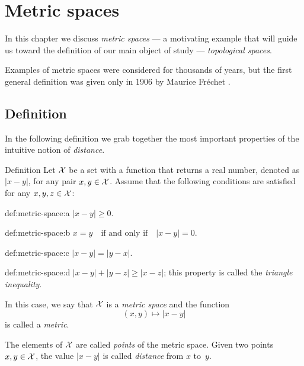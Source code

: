 \chapter{Metric spaces}

In this chapter we discuss \textit{metric spaces} --- 
a motivating example that will guide us toward the definition of our main object of study ---
\textit{topological spaces}.

Examples of metric spaces were considered for thousands of years,
but the first general definition was given only in 1906 by Maurice Fr\'echet \cite{frechet}.

\section{Definition}

In the following definition we grab together the most important properties of the intuitive notion of \textit{distance}.

\begin{thm}{Definition}\label{def:metric-space}
Let $\mathcal X$ be a set 
with a function 
that returns a real number, denoted as $|x-y|$,
for any pair $x,y\in\mathcal X$.
Assume that the following conditions are satisfied for any
$x,y,z\in \mathcal X$:

\begin{subthm}{def:metric-space:a}
$|x-y|\ge 0.$
\end{subthm}

\begin{subthm}{def:metric-space:b}
$x=y\quad\text{if and only if}\quad |x-y|=0.$
\end{subthm}

\begin{subthm}{def:metric-space:c}
$|x-y| = |y- x|.$
\end{subthm}

\begin{subthm}{def:metric-space:d}
$|x- y| + |y- z| \ge |x-z|$; this property is called the \emph{triangle inequality}.
\end{subthm}

In this case, we say that $\mathcal X$ is a \emph{metric space} 
and the function 
\[(x,y)\mapsto |x-y|\] 
is called a \emph{metric}. 

The elements of $\mathcal X$ are called \emph{points} of the metric space.
Given two points $x,y\z\in \c X$, 
the value $|x-y|$ is called \emph{distance} from $x$ to~$y$.
\end{thm}

